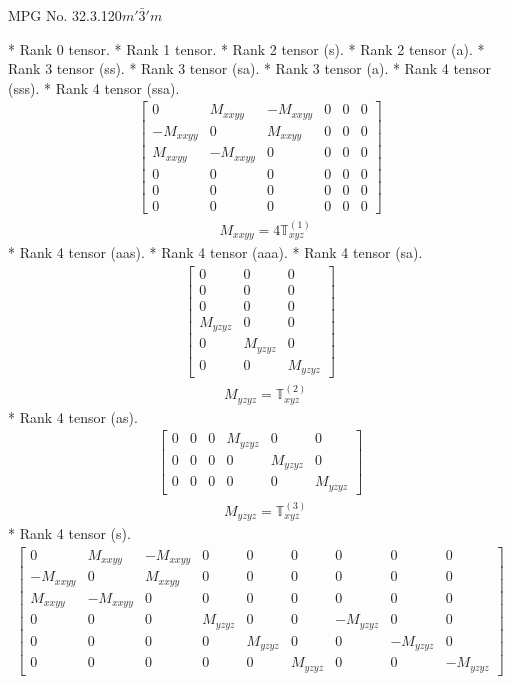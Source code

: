 \documentclass[fleqn,8pt,landscape]{jsarticle}
\begin{document}
\setcounter{MaxMatrixCols}{32}

\renewcommand{\tablename}{Table~}
\renewcommand{\figurename}{Figure~}
\begin{center}
\LARGE
MPG No. 32.3.120\quad$m'\bar{3}'m$
\end{center}
* Rank 0 tensor.
* Rank 1 tensor.
* Rank 2 tensor (s).
* Rank 2 tensor (a).
* Rank 3 tensor (ss).
* Rank 3 tensor (sa).
* Rank 3 tensor (a).
* Rank 4 tensor (sss).
* Rank 4 tensor (ssa).
\begin{align*}
\begin{bmatrix} 0 & M_{xxyy} & - M_{xxyy} & 0 & 0 & 0 \\ - M_{xxyy} & 0 & M_{xxyy} & 0 & 0 & 0 \\ M_{xxyy} & - M_{xxyy} & 0 & 0 & 0 & 0 \\ 0 & 0 & 0 & 0 & 0 & 0 \\ 0 & 0 & 0 & 0 & 0 & 0 \\ 0 & 0 & 0 & 0 & 0 & 0 \end{bmatrix}
\end{align*}
\begin{align*}
& M_{xxyy} = 4 \mathbb{T}_{xyz}^{(1)}
\end{align*}
* Rank 4 tensor (aas).
* Rank 4 tensor (aaa).
* Rank 4 tensor (sa).
\begin{align*}
\begin{bmatrix} 0 & 0 & 0 \\ 0 & 0 & 0 \\ 0 & 0 & 0 \\ M_{yzyz} & 0 & 0 \\ 0 & M_{yzyz} & 0 \\ 0 & 0 & M_{yzyz} \end{bmatrix}
\end{align*}
\begin{align*}
& M_{yzyz} = \mathbb{T}_{xyz}^{(2)}
\end{align*}
* Rank 4 tensor (as).
\begin{align*}
\begin{bmatrix} 0 & 0 & 0 & M_{yzyz} & 0 & 0 \\ 0 & 0 & 0 & 0 & M_{yzyz} & 0 \\ 0 & 0 & 0 & 0 & 0 & M_{yzyz} \end{bmatrix}
\end{align*}
\begin{align*}
& M_{yzyz} = \mathbb{T}_{xyz}^{(3)}
\end{align*}
* Rank 4 tensor (s).
\begin{align*}
\begin{bmatrix} 0 & M_{xxyy} & - M_{xxyy} & 0 & 0 & 0 & 0 & 0 & 0 \\ - M_{xxyy} & 0 & M_{xxyy} & 0 & 0 & 0 & 0 & 0 & 0 \\ M_{xxyy} & - M_{xxyy} & 0 & 0 & 0 & 0 & 0 & 0 & 0 \\ 0 & 0 & 0 & M_{yzyz} & 0 & 0 & - M_{yzyz} & 0 & 0 \\ 0 & 0 & 0 & 0 & M_{yzyz} & 0 & 0 & - M_{yzyz} & 0 \\ 0 & 0 & 0 & 0 & 0 & M_{yzyz} & 0 & 0 & - M_{yzyz} \end{bmatrix}
\end{align*}
\end{document}
